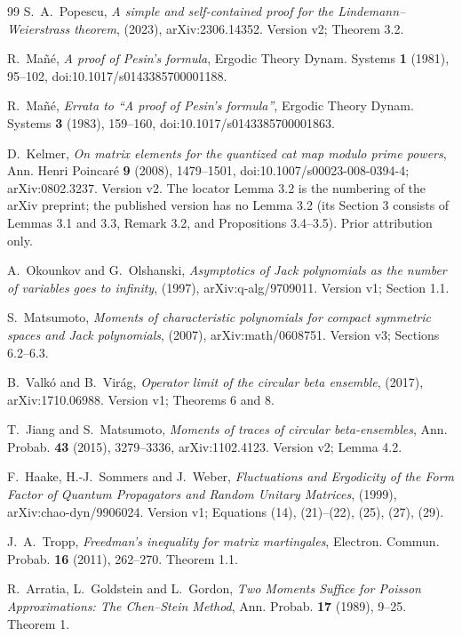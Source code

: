 \begin{thebibliography}{99}
S.~A.~Popescu,
\emph{A simple and self-contained proof for the Lindemann--Weierstrass theorem},
(2023),
arXiv:2306.14352.
Version v2; Theorem 3.2.

R.~Ma\~n\'e,
\emph{A proof of Pesin's formula},
Ergodic Theory Dynam. Systems \textbf{1} (1981), 95--102,
doi:10.1017/s0143385700001188.

R.~Ma\~n\'e,
\emph{Errata to ``A proof of Pesin's formula''},
Ergodic Theory Dynam. Systems \textbf{3} (1983), 159--160,
doi:10.1017/s0143385700001863.

D.~Kelmer,
\emph{On matrix elements for the quantized cat map modulo prime powers},
Ann. Henri Poincar\'e \textbf{9} (2008), 1479--1501,
doi:10.1007/s00023-008-0394-4; arXiv:0802.3237.
Version v2. The locator Lemma 3.2 is the numbering of the arXiv preprint; the published version has no Lemma 3.2 (its Section 3 consists of Lemmas 3.1 and 3.3, Remark 3.2, and Propositions 3.4--3.5). Prior attribution only.

A.~Okounkov and G.~Olshanski,
\emph{Asymptotics of Jack polynomials as the number of variables goes to infinity},
(1997),
arXiv:q-alg/9709011.
Version v1; Section 1.1.

S.~Matsumoto,
\emph{Moments of characteristic polynomials for compact symmetric spaces and Jack polynomials},
(2007),
arXiv:math/0608751.
Version v3; Sections 6.2--6.3.

B.~Valk\'o and B.~Vir\'ag,
\emph{Operator limit of the circular beta ensemble},
(2017),
arXiv:1710.06988.
Version v1; Theorems 6 and 8.

T.~Jiang and S.~Matsumoto,
\emph{Moments of traces of circular beta-ensembles},
Ann. Probab. \textbf{43} (2015), 3279--3336,
arXiv:1102.4123.
Version v2; Lemma 4.2.

F.~Haake, H.-J.~Sommers and J.~Weber,
\emph{Fluctuations and Ergodicity of the Form Factor of Quantum Propagators and Random Unitary Matrices},
(1999),
arXiv:chao-dyn/9906024.
Version v1; Equations (14), (21)--(22), (25), (27), (29).

J.~A.~Tropp,
\emph{Freedman's inequality for matrix martingales},
Electron. Commun. Probab. \textbf{16} (2011), 262--270.
Theorem 1.1.

R.~Arratia, L.~Goldstein and L.~Gordon,
\emph{Two Moments Suffice for Poisson Approximations: The Chen--Stein Method},
Ann. Probab. \textbf{17} (1989), 9--25.
Theorem 1.


\end{thebibliography}
